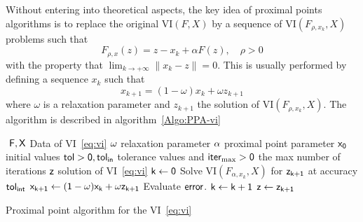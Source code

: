 Without entering into theoretical aspects, the key idea of proximal points algorithms is to replace the original $\mathrm{VI}(F,X)$ by a sequence of $\mathrm{VI}(F_{\rho,x_k},X)$  problems such that 
\begin{equation}
  \label{eq:prox-algo-1}
  F_{\rho,x}(z) = z - x_k+ \alpha F(z) , \quad \rho > 0 
\end{equation}
with the property that $\lim_{ k \rightarrow +\infty} \| x_k -z \| = 0$. This is usually performed by defining a sequence $x_k$ such that
\begin{equation}
  \label{eq:prox-algo-2}
  x_{k+1} = (1-\omega) x_{k} + \omega z_{k+1}
\end{equation}
where $\omega$ is a relaxation parameter and $z_{k+1}$ the solution of $\mathrm{VI}(F_{\rho,x_k},X)$. The algorithm is described in algorithm~\ref{Algo:PPA-vi}
\begin{algorithm}
  \begin{algorithmic}
    {\sf
      \STATE $ $
      \REQUIRE $\sf F,X$ Data of VI~\eqref{eq:vi}
      \REQUIRE $\sf \omega$ relaxation parameter
      \REQUIRE $\sf \alpha$ proximal point parameter
      \REQUIRE $\sf x_0$ initial values
      \REQUIRE $\sf tol >0, tol_{in}$ tolerance values and $\sf iter_{\max}  >0$ the max number of iterations
      \ENSURE  $\sf z$ solution of VI~\eqref{eq:vi}
      \STATE   $\sf k \leftarrow 0$ 
      \STATE Solve $\mathrm{VI}(F_{\alpha,x_k},X)$ for $\sf z_{k+1}$ at accuracy $\sf tol_{int}$
      \STATE $\sf x_{k+1} \leftarrow (1-\omega) x_{k} + \omega z_{k+1}$
      \STATE Evaluate $\sf error$.
      \STATE $\sf k \leftarrow k+1$
      \ENDWHILE
      \STATE $\sf z \leftarrow z_{k+1}$ 
    }
  \end{algorithmic}
  \caption{Proximal point algorithm for the VI~\eqref{eq:vi}}  \label{Algo:PPA-vi}
\end{algorithm}

